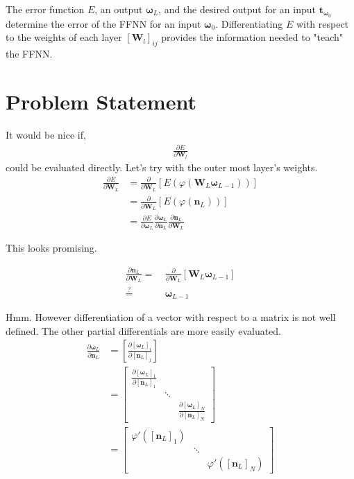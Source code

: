 \documentclass[12pt,letterpaper]{article}
\begin{document}
The error function $E$, an output $\boldsymbol{\omega}_L$, and the desired output for an input $\boldsymbol{t}_{\boldsymbol{\omega}_0}$  determine the error of the FFNN for an input $\boldsymbol{\omega}_0$.  Differentiating $E$ with respect to the weights of each layer $\left[\textbf{W}_l\right]_{ij}$ provides the information needed to "teach" the FFNN.

\section{Problem Statement}

It would be nice if,
\begin{align}
\frac{\partial E}{\partial \boldsymbol{W}_l}
\end{align}
could be evaluated directly. Let's try with the outer most layer's weights.
\begin{align}
\frac{\partial E}{\partial \boldsymbol{W}_L} 
&= 
\frac{\partial}{\partial \boldsymbol{W}_L}\left[E( \varphi(\boldsymbol{W}_{L} \boldsymbol{\omega}_{L-1}))\right] \\
&=
\frac{\partial}{\partial \boldsymbol{W}_L}\left[E( \varphi(\boldsymbol{n}_L))\right] \\
&=
\frac{\partial E}{\partial \boldsymbol{\omega}_{L}} 
\frac{\partial \boldsymbol{\omega}_{L}}{\partial \boldsymbol{n}_L}
\frac{\partial \boldsymbol{n}_L}{\partial \boldsymbol{W}_L}
\end{align}

This looks promising.  

\begin{align}
\frac{\partial \boldsymbol{n}_L}{\partial \boldsymbol{W}_L} =&\ 
\frac{\partial}{\partial \boldsymbol{W}_L} \left[ \boldsymbol{W}_{L} \boldsymbol{\omega}_{L-1} \right] \\
\stackrel{?}{=}&\ \boldsymbol{\omega}_{L-1}
\end{align}

Hmm.  However differentiation of a vector with respect to a matrix is not well defined.  The other partial differentials are more easily evaluated.
\begin{align}
\frac{\partial \boldsymbol{\omega}_{L}}{\partial \boldsymbol{n}_L} 
&=
\left[ \frac{\partial \left[ \boldsymbol{\omega}_{L} \right]_i}{\partial \left[ \boldsymbol{n}_L\right]_j} \right] \\
&=
\begin{bmatrix}
\frac{\partial \left[ \boldsymbol{\omega}_{L} \right]_1}{\partial \left[ \boldsymbol{n}_L\right]_1} &\\ 
& \ddots &\\ 
& & \frac{\partial \left[ \boldsymbol{\omega}_{L} \right]_N}{\partial \left[ \boldsymbol{n}_L\right]_N}
\end{bmatrix} \\
&=
\begin{bmatrix}
\varphi'(\left[\boldsymbol{n}_L\right]_1) & \\ 
& \ddots &\\ 
& & \varphi'(\left[\boldsymbol{n}_L\right]_N)
\end{bmatrix}
\end{align}
\end{document}
